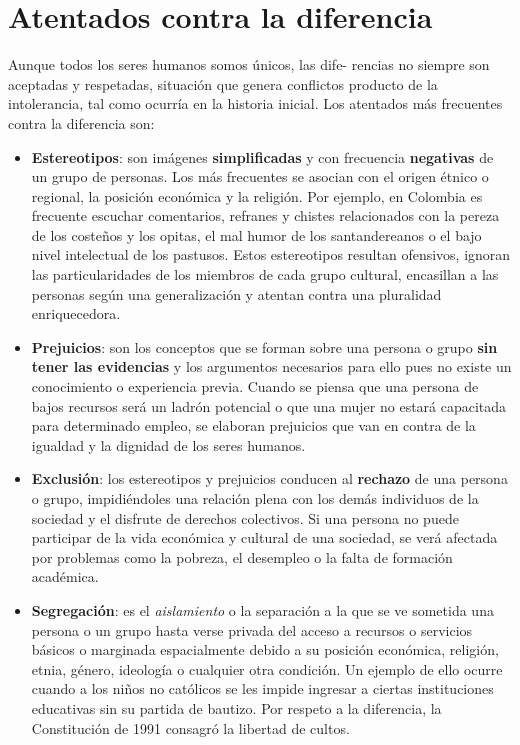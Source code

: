 \documentclass[10pt,twoside]{article}
\begin{document}
\section*{Atentados contra la diferencia}
Aunque todos los seres humanos somos únicos, las dife-
rencias no siempre son aceptadas y respetadas, situación
que genera conflictos producto de la intolerancia, tal como
ocurría en la historia inicial. Los atentados más frecuentes
contra la diferencia son:
\begin{itemize}
\item \textbf{Estereotipos}: son imágenes \textbf{simplificadas} y con frecuencia \textbf{negativas} de un grupo de personas. Los más frecuentes se asocian con el origen étnico o regional, la posición económica y la religión. Por ejemplo, en Colombia es frecuente escuchar comentarios, refranes y chistes relacionados con la pereza de los costeños
y los opitas, el mal humor de los santandereanos o el
bajo nivel intelectual de los pastusos. Estos estereotipos
resultan ofensivos, ignoran las particularidades de
los miembros de cada grupo cultural, encasillan a las
personas según una generalización y atentan contra una
pluralidad enriquecedora.
\item \textbf{Prejuicios}: son los conceptos que se forman sobre una
persona o grupo \textbf{sin tener las evidencias} y los argumentos
necesarios para ello pues no existe un conocimiento o
experiencia previa. Cuando se piensa que una persona de
bajos recursos será un ladrón potencial o que una mujer no
estará capacitada para determinado empleo, se elaboran
prejuicios que van en contra de la igualdad y la dignidad de
los seres humanos.
\item \textbf{Exclusión}: los estereotipos y prejuicios conducen al \textbf{rechazo} de una persona o grupo, impidiéndoles una relación
plena con los demás individuos de la sociedad y el disfrute
de derechos colectivos. Si una persona no puede participar
de la vida económica y cultural de una sociedad, se verá
afectada por problemas como la pobreza, el desempleo o la
falta de formación académica.
\item \textbf{Segregación}: es el \emph{aislamiento} o la separación a la que se ve sometida una persona o un grupo hasta verse privada del acceso a recursos o servicios básicos o marginada espacialmente debido a su posición económica, religión, etnia, género, ideología o cualquier otra condición. Un ejemplo de ello ocurre cuando a los niños no católicos se
les impide ingresar a ciertas instituciones educativas sin su
partida de bautizo. Por respeto a la diferencia, la Constitución de 1991 consagró la libertad de cultos.
\end{itemize}
\end{document}
